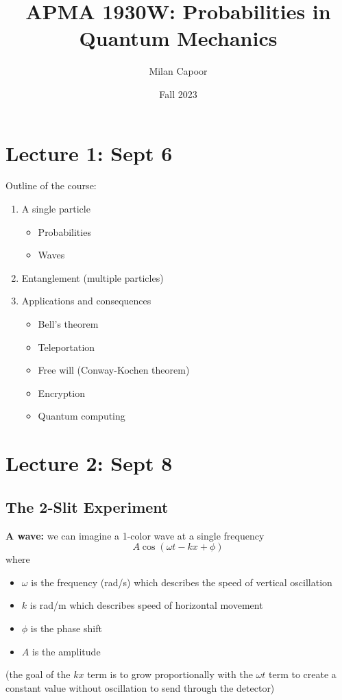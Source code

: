 \documentclass[12pt]{article}
\title{APMA 1930W: Probabilities in Quantum Mechanics}
\author{Milan Capoor}
\date{Fall 2023}
\begin{document}
\maketitle
\section*{Lecture 1: Sept 6}
Outline of the course:
\begin{enumerate}
    \item A single particle
    \begin{itemize}
        \item Probabilities
        \item Waves
    \end{itemize}

    \item Entanglement (multiple particles)
    \item Applications and consequences
    \begin{itemize}
        \item Bell's theorem
        \item Teleportation
        \item Free will (Conway-Kochen theorem)
        \item Encryption
        \item Quantum computing 
    \end{itemize}
\end{enumerate}

\section*{Lecture 2: Sept 8}
\subsection*{The 2-Slit Experiment}
\textbf{A wave:} we can imagine a 1-color wave at a single frequency
\[A\cos(\omega t - kx + \phi)\]
where 
\begin{itemize}
    \item $\omega$ is the frequency (rad/s) which describes the speed of vertical oscillation
    \item $k$ is rad/m which describes speed of horizontal movement
    \item $\phi$ is the phase shift 
    \item $A$ is the amplitude 
\end{itemize}

(the goal of the $kx$ term is to grow proportionally with the $\omega t$ term to create a constant value without oscillation to send through the detector)
\end{document}
